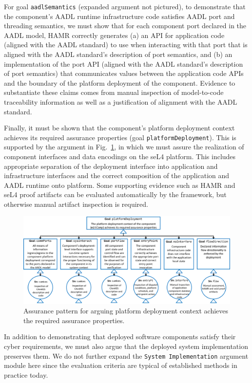 For goal \texttt{aadlSemantics} (expanded argument not pictured), to demonstrate that the component's AADL runtime infrastructure code satisfies AADL port and threading semantics, we must show that for each component port declared in the AADL model, HAMR correctly generates (a) an API for application code (aligned with the AADL standard) to use when interacting with that port that is aligned with the AADL standard's description of port semantics, and (b) an implementation of the port API (aligned with the AADL standard's description of port semantics) that communicates values between the application code APIs and the boundary of the platform deployment of the component.  Evidence to substantiate these claims comes from manual inspection of model-to-code traceability information as well as a justification of alignment with the AADL standard.

Finally, it must be shown that the component's platform deployment context achieves its required assurance properties (goal \texttt{platformDeployment}).  This is supported by the argument in Fig.~\ref{fig:platform-deployment-context-achieves-assurance-properties}, in which we must assure the realization of component interfaces and data encodings on the seL4 platform.  This includes appropriate separation of the deployment interface into application and infrastructure interfaces and the correct composition of the application and AADL runtime onto platform.  Some supporting evidence such as HAMR and seL4 proof artifacts can be evaluated automatically by the framework, but otherwise manual artifact inspection is required.

\begin{figure}[h] 
	\centering 
	\includegraphics[width=\textwidth]{figs/platform-deployment-context-achieves-assurance-properties.png}
	\caption{Assurance pattern for arguing platform deployment context achieves the required assurance properties.}
	\label{fig:platform-deployment-context-achieves-assurance-properties} 
\end{figure}

In addition to demonstrating that deployed software components satisfy their cyber requirements, we must also argue that the deployed system implementation preserves them.  We do not further expand the \texttt{System Implementation} argument module here since the evaluation criteria are typical of established methods in practice today.
